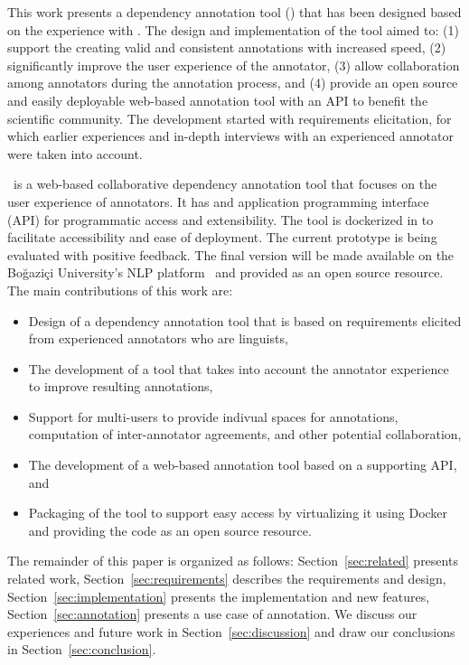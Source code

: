 This work presents a dependency annotation tool (\boatvtwo) that has been designed based on the experience with \boatvone.
The design and implementation of the tool aimed to: (1) support the creating valid and consistent annotations with increased speed, (2) significantly improve the user experience of the annotator, (3) allow collaboration among annotators during the annotation process, and (4) provide an open source and easily deployable web-based annotation tool with an API to benefit the scientific community.
The development started with requirements elicitation, for which earlier experiences and in-depth interviews with an experienced annotator were taken into account.

\boatvtwo\ is a web-based collaborative dependency annotation tool that focuses on the user experience of annotators. 
It has and application programming interface (API) for programmatic access and extensibility. 
The tool is dockerized in to facilitate accessibility and ease of  deployment.
The current prototype is being evaluated with positive feedback.
The final version will be made available on the Boğaziçi University's NLP platform~\cite{DIP} and provided as an open source resource.
The main contributions of this work are:
\begin{itemize}
\setlength\itemsep{0em}
        \item Design of a dependency annotation tool that is based on requirements elicited from experienced annotators who are linguists,
        \item The development of a tool that takes into account the annotator experience to improve resulting annotations,
        \item Support for multi-users to provide indivual spaces for annotations, computation of inter-annotator agreements, and other potential collaboration,
        \item The development of a web-based annotation tool based on a supporting API, and
        \item Packaging of the tool to support easy access by virtualizing it using Docker and providing the code as an open source resource.
\end{itemize}

The remainder of this paper is organized as follows:
Section~\ref{sec:related} presents related work,
Section~\ref{sec:requirements} describes the requirements and design,
Section~\ref{sec:implementation} presents the implementation and new features,
Section~\ref{sec:annotation} presents a use case of annotation.
We discuss our experiences and future work in Section~\ref{sec:discussion} and draw our conclusions in Section~\ref{sec:conclusion}.
